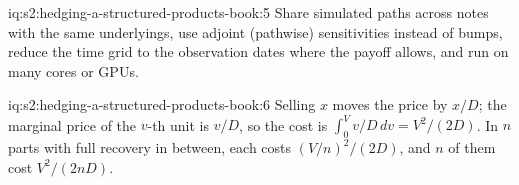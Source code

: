 \begin{solution}{iq:s2:hedging-a-structured-products-book:5}
Share simulated paths across notes with the same underlyings, use adjoint (pathwise) sensitivities instead of bumps, reduce the time grid to the
observation dates where the payoff allows, and run on many cores or GPUs.
\end{solution}

\begin{solution}{iq:s2:hedging-a-structured-products-book:6}
Selling $x$ moves the price by $x/D$; the marginal price of the $v$-th unit is $v/D$, so the cost is $\int_0^V v/D\,dv = V^2/(2D)$. In $n$ parts
with full recovery in between, each costs $(V/n)^2/(2D)$, and $n$ of them cost $V^2/(2nD)$.
\end{solution}

